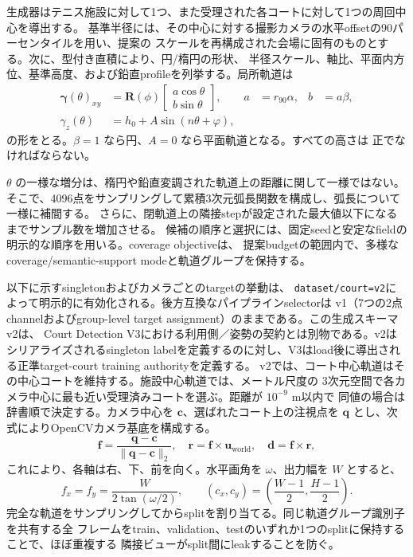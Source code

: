 生成器はテニス施設に対して1つ、また受理された各コートに対して1つの周回中心を導出する。
基準半径には、その中心に対する撮影カメラの水平offsetの90パーセンタイルを用い、提案の
スケールを再構成された会場に固有のものとする。次に、型付き直積により、円/楕円の形状、
半径スケール、軸比、平面内方位、基準高度、および鉛直profileを列挙する。局所軌道は
\begin{align}
  \bm{\gamma}(\theta)_{xy}
    &=\mathbf{R}(\phi)
      \begin{bmatrix}a\cos\theta\\b\sin\theta\end{bmatrix},
      &a&=r_{90}\alpha, &b&=a\beta, \\
  \gamma_z(\theta)
    &=h_0+A\sin(n\theta+\varphi),
  \label{eq:trajectory}
\end{align}
の形をとる。\(\beta=1\) なら円、\(A=0\) なら平面軌道となる。すべての高さは
正でなければならない。

\(\theta\) の一様な増分は、楕円や鉛直変調された軌道上の距離に関して一様ではない。
そこで、4096点をサンプリングして累積3次元弧長関数を構成し、弧長について一様に補間する。
さらに、閉軌道上の隣接stepが設定された最大値以下になるまでサンプル数を増加させる。
候補の順序と選択には、固定seedと安定なfieldの明示的な順序を用いる。coverage objectiveは、
提案budgetの範囲内で、多様なcoverage/semantic-support modeと軌道グループを保持する。

以下に示すsingletonおよびカメラごとのtargetの挙動は、
\texttt{dataset/court=v2}によって明示的に有効化される。後方互換なパイプラインselectorは
v1（7つの2点channelおよびgroup-level target assignment）のままである。この生成スキーマv2は、
Court Detection V3における利用側／姿勢の契約とは別物である。v2はシリアライズされるsingleton
labelを定義するのに対し、V3はload後に導出される正準target-court training authorityを定義する。
v2では、コート中心軌道はその中心コートを維持する。施設中心軌道では、メートル尺度の
3次元空間で各カメラ中心に最も近い受理済みコートを選ぶ。距離が \(10^{-9}\) m以内で
同値の場合は辞書順で決定する。カメラ中心を \(\mathbf{c}\)、選ばれたコート上の注視点を
\(\mathbf{q}\) とし、次式によりOpenCVカメラ基底を構成する。
\begin{equation}
  \mathbf{f}=\frac{\mathbf{q}-\mathbf{c}}{\|\mathbf{q}-\mathbf{c}\|_2},\quad
  \mathbf{r}=\mathbf{f}\times\mathbf{u}_{\mathrm{world}},\quad
  \mathbf{d}=\mathbf{f}\times\mathbf{r},
  \label{eq:lookat}
\end{equation}
これにより、各軸は右、下、前を向く。水平画角を \(\omega\)、出力幅を \(W\) とすると、
\begin{equation}
  f_x=f_y=\frac{W}{2\tan(\omega/2)},\qquad
  (c_x,c_y)=\left(\frac{W-1}{2},\frac{H-1}{2}\right).
  \label{eq:intrinsics}
\end{equation}
完全な軌道をサンプリングしてからsplitを割り当てる。同じ軌道グループ識別子を共有する全
フレームをtrain、validation、testのいずれか1つのsplitに保持することで、ほぼ重複する
隣接ビューがsplit間にleakすることを防ぐ。

